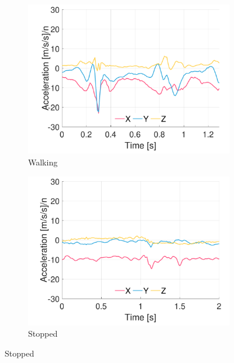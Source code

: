\begin{figure}[p]
\centering
    \begin{subfigure}[b]{0.49\textwidth}
         \centering
         \includegraphics[width=\textwidth]{content/3-Methods/example-data/ch3_example_data_subject_01_r_hip_accel_activity_walking.pdf}
         \caption{Walking}
    \end{subfigure}
    \begin{subfigure}[b]{0.49\textwidth}
         \centering
         \includegraphics[width=\textwidth]{content/3-Methods/example-data/ch3_example_data_subject_01_r_hip_accel_activity_stop.pdf}
         \caption{Stopped}
    \end{subfigure}
    

\end{figure}
